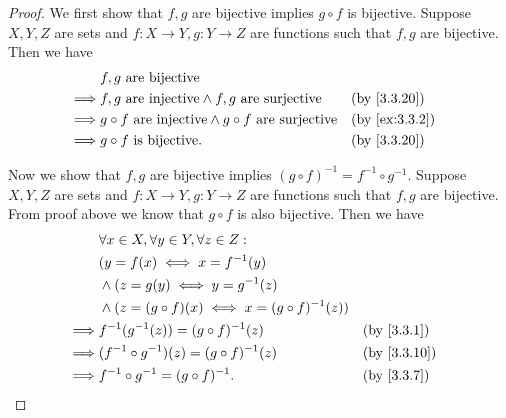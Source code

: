 \begin{proof}
  We first show that \(f, g\) are bijective implies \(g \circ f\) is bijective.
  Suppose \(X, Y, Z\) are sets and \(f : X \to Y, g : Y \to Z\) are functions such that \(f, g\) are bijective.
  Then we have
  \begin{align*}
             & f, g \text{ are bijective}                                                                              \\
    \implies & f, g \text{ are injective} \land f, g \text{ are surjective}           &  & \text{(by \cref{3.3.20})}   \\
    \implies & g \circ f \text{ are injective} \land g \circ f \text{ are surjective} &  & \text{(by \cref{ex:3.3.2})} \\
    \implies & g \circ f \text{ is bijective}.                                        &  & \text{(by \cref{3.3.20})}
  \end{align*}

  Now we show that \(f, g\) are bijective implies \((g \circ f)^{-1} = f^{-1} \circ g^{-1}\).
  Suppose \(X, Y, Z\) are sets and \(f : X \to Y, g : Y \to Z\) are functions such that \(f, g\) are bijective.
  From proof above we know that \(g \circ f\) is also bijective.
  Then we have
  \begin{align*}
             & \forall x \in X, \forall y \in Y, \forall z \in Z :                                    \\
             & (y = f(x) \iff x = f^{-1}(y)                                                           \\
             & \land (z = g(y) \iff y = g^{-1}(z)                                                     \\
             & \land (z = (g \circ f)(x) \iff x = (g \circ f)^{-1}(z))                                \\
    \implies & f^{-1}(g^{-1}(z)) = (g \circ f)^{-1}(z)                 &  & \text{(by \cref{3.3.1})}  \\
    \implies & (f^{-1} \circ g^{-1})(z) = (g \circ f)^{-1}(z)          &  & \text{(by \cref{3.3.10})} \\
    \implies & f^{-1} \circ g^{-1} = (g \circ f)^{-1}.                 &  & \text{(by \cref{3.3.7})}
  \end{align*}
\end{proof}

